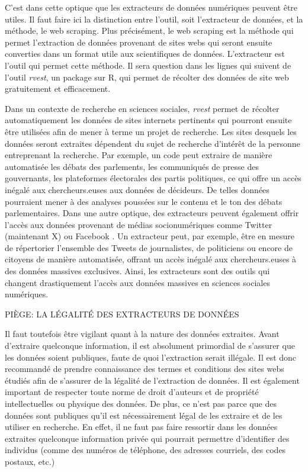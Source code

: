 \documentclass[
  letterpaper,
  DIV=11,
  numbers=noendperiod]{scrreprt}
\begin{document}
C'est dans cette optique que les extracteurs de données numériques
peuvent être utiles. Il faut faire ici la distinction entre l'outil,
soit l'extracteur de données, et la méthode, le web scraping. Plus
précisément, le web scraping est la méthode qui permet l'extraction de
données provenant de sites webs qui seront ensuite converties dans un
format utile aux scientifiques de données. L'extracteur est l'outil qui
permet cette méthode. Il sera question dans les lignes qui suivent de
l'outil \emph{rvest}, un package sur R, qui permet de récolter des
données de site web gratuitement et efficacement.

Dans un contexte de recherche en sciences sociales, \emph{rvest} permet
de récolter automatiquement les données de sites internets pertinents
qui pourront ensuite être utilisées afin de mener à terme un projet de
recherche. Les sites desquels les données seront extraites dépendent du
sujet de recherche d'intérêt de la personne entreprenant la recherche.
Par exemple, un code peut extraire de manière automatisée les débats des
parlements, les communiqués de presse des gouvernants, les plateformes
électorales des partis politiques, ce qui offre un accès inégalé aux
chercheurs.euses aux données de décideurs. De telles données pourraient
mener à des analyses poussées sur le contenu et le ton des débats
parlementaires. Dans une autre optique, des extracteurs peuvent
également offrir l'accès aux données provenant de médias socionumériques
comme Twitter (maintenant X) ou Facebook . Un extracteur peut, par
exemple, être en mesure de répertorier l'ensemble des Tweets de
journalistes, de politiciens ou encore de citoyens de manière
automatisée, offrant un accès inégalé aux chercheurs.euses à des données
massives exclusives. Ainsi, les extracteurs sont des outils qui changent
drastiquement l'accès aux données massives en sciences sociales
numériques.

PIÈGE: LA LÉGALITÉ DES EXTRACTEURS DE DONNÉES

Il faut toutefois être vigilant quant à la nature des données extraites.
Avant d'extraire quelconque information, il est absolument primordial de
s'assurer que les données soient publiques, faute de quoi l'extraction
serait illégale. Il est donc recommandé de prendre connaissance des
termes et conditions des sites webs étudiés afin de s'assurer de la
légalité de l'extraction de données. Il est également important de
respecter toute norme de droit d'auteurs et de propriété intellectuelles
ou physique des données. De plus, ce n'est pas parce que des données
sont publiques qu'il est nécessairement légal de les extraire et de les
utiliser en recherche. En effet, il ne faut pas faire ressortir dans les
données extraites quelconque information privée qui pourrait permettre
d'identifier des individus (comme des numéros de téléphone, des adresses
courriels, des codes postaux, etc.)
\end{document}
